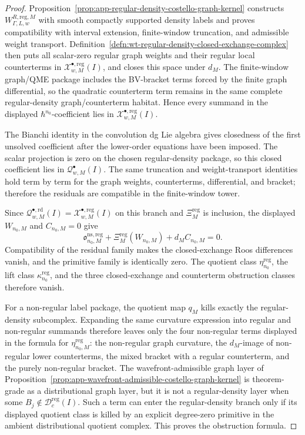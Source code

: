 \begin{proof}
  Proposition~\ref{prop:app-regular-density-costello-graph-kernel}
  constructs \(W^{R,\mathrm{reg},M}_{\Gamma,L,w}\) with smooth compactly
  supported density labels and proves compatibility with interval
  extension, finite-window truncation, and admissible weight transport.
  Definition~\ref{defn:wt-regular-density-closed-exchange-complex} then
  puts all scalar-zero regular graph weights and their regular local
  counterterms in
  \(\mathcal X^{\bullet,\mathrm{reg}}_{w,M}(I)\), and closes this space
  under \(d_M\).  The finite-window graph/QME package includes the
  BV-bracket terms forced by the finite graph differential, so the
  quadratic counterterm term remains in the same complete regular-density
  graph/counterterm habitat.  Hence every summand in the displayed
  \(\hbar^{n_0}\)-coefficient lies in
  \(\mathcal X^{\bullet,\mathrm{reg}}_{w,M}(I)\).

  The Bianchi identity in the convolution dg Lie algebra gives closedness
  of the first unsolved coefficient after the lower-order equations have
  been imposed.  The scalar projection is zero on the chosen
  regular-density package, so this closed coefficient lies in
  \(\mathcal Q^\bullet_{w,M}(I)\).  The same truncation and
  weight-transport identities hold term by term for the graph weights,
  counterterms, differential, and bracket; therefore the residuals are
  compatible in the finite-window tower.

  Since
  \(\mathcal Q^{\bullet,\mathrm{rd}}_{w,M}(I)=
  \mathcal X^{\bullet,\mathrm{reg}}_{w,M}(I)\) on this branch and
  \(\Xi^{\mathrm{reg}}_M\) is inclusion, the displayed
  \(W_{n_0,M}\) and \(C_{n_0,M}=0\) give
  \[
    \mathfrak o^{\mathrm{ns,reg}}_{n_0,M}
      +\Xi^{\mathrm{reg}}_M(W_{n_0,M})
      +d_MC_{n_0,M}=0.
  \]
  Compatibility of the residual family makes the closed-exchange Roos
  differences vanish, and the primitive family is identically zero.  The
  quotient class \(\eta^{\mathrm{reg}}_{n_0}\), the lift class
  \(\kappa^{\mathrm{reg}}_{n_0}\), and the three closed-exchange and
  counterterm obstruction classes therefore vanish.

  For a non-regular label package, the quotient map \(q_M\) kills exactly
  the regular-density subcomplex.  Expanding the same curvature expression
  into regular and non-regular summands therefore leaves only the four
  non-regular terms displayed in the formula for
  \(\eta^{\mathrm{reg}}_{n_0,M}\): the non-regular graph curvature, the
  \(d_M\)-image of non-regular lower counterterms, the mixed bracket with
  a regular counterterm, and the purely non-regular bracket.  The
  wavefront-admissible graph layer of
  Proposition~\ref{prop:app-wavefront-admissible-costello-graph-kernel}
  is theorem-grade as a distributional graph layer, but it is not a
  regular-density layer when some \(B_j\notin
  \mathcal D^{\mathrm{reg}}_c(I)\).  Such a term can enter the
  regular-density branch only if its displayed quotient class is killed
  by an explicit degree-zero primitive in the ambient distributional
  quotient complex.  This proves the obstruction formula.
\end{proof}

